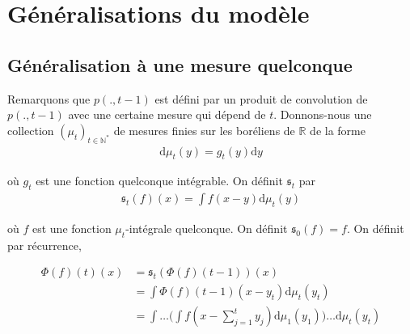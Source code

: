 \documentclass{article}
\theoremstyle{definition}
\begin{document}
\section{Généralisations du modèle}
\subsection{Généralisation à une mesure quelconque}
Remarquons que $p(.,t-1)$ est défini par un produit de convolution de $p(.,t-1)$ avec une certaine mesure qui dépend de $t$. Donnons-nous une collection $(\mu_t)_{t\in\mathbb{N}^*}$ de mesures finies sur les boréliens de $\mathbb{R}$ de la forme  
\begin{align*}
	\mathrm{d}\mu_t(y) = g_t(y)\mathrm{d}y
\end{align*}

où $g_t$ est une fonction quelconque intégrable. On définit $\mathfrak{s}_t$ par
\begin{align}
	\mathfrak{s}_t(f)(x) =\int f(x-y)\mathrm{d}\mu_t(y)
\end{align}

où $f$ est une fonction $\mu_t$-intégrale quelconque. On définit $\mathfrak{s}_0(f) = f$. On définit par récurrence, 

\begin{align*}
	\Phi(f)(t)(x) &= \mathfrak{s}_t(\Phi(f)(t-1))(x)\\
		      &=\int \Phi(f)(t-1)(x-y_t)\mathrm{d}\mu_t(y_t)\\
		      &=\int \ldots \bigg(\int f(x-\sum_{j=1}^t y_j) \mathrm{d}\mu_1(y_1)\bigg)\ldots \mathrm{d}\mu_t(y_t)
\end{align*}
\end{document}
